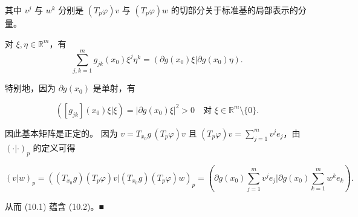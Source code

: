\begin{remark}
\begin{items}
其中 $ v^{j} $ 与 $ w^{k} $ 分别是 $ (T_{p}\varphi)v $ 与 $ (T_{p}\varphi)w $ 的切部分关于标准基的局部表示的分量。

\proofhead
对 $ \xi,\eta \in \mathbb{R}^{m} $，有
\begin{equation}
\sum_{j,k=1}^{m}g_{jk}(x_{0})\xi^{j}\eta^{k} = \left(\partial g(x_{0})\xi\big|\partial g(x_{0})\eta\right) .\tag{10.2}
\end{equation}

特别地，因为 $ \partial g(x_{0}) $ 是单射，有

\[
\left([g_{jk}](x_{0})\xi\big|\xi\right) = |\partial g(x_{0})\xi|^{2} > 0 \quad \text{对 } \xi \in \mathbb{R}^{m}\setminus\{0\} .
\]

因此基本矩阵是正定的。
因为 $ v = T_{x_{0}}g\,(T_{p}\varphi)v $ 且 $ (T_{p}\varphi)v = \sum_{j=1}^{m}v^{j}e_{j} $，由 $ (\cdot|\cdot)_{p} $ 的定义可得

\[
(v|w)_{p} = \left((T_{x_{0}}g)(T_{p}\varphi)v\big|(T_{x_{0}}g)(T_{p}\varphi)w\right)_{p} = \left(\partial g(x_{0})\sum_{j=1}^{m}v^{j}e_{j}\Big|\partial g(x_{0})\sum_{k=1}^{m}w^{k}e_{k}\right) .
\]

从而 (10.1) 蕴含 (10.2)。\nobreak\hspace{0.35em}■

\end{items}

\end{remark}

